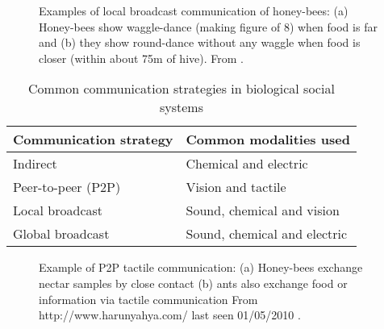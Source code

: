\begin{figure}
\centering
{} 
\hspace{0.25cm}
\caption{Examples of local broadcast communication of honey-bees: (a) Honey-bees show waggle-dance (making figure of 8) when food is far and (b) they show round-dance without any waggle when food is closer (within about 75m of hive). From \protect{}.}
\label{fig:honey-bee-dances}
\end{figure}
\begin{table}
\caption{Common communication strategies in biological social systems}
\label{table:bio-comm-strategy}
\begin{center}
\begin{tabular}{ll}
\hline 
\textbf{Communication strategy} & \textbf{Common modalities used}\\
\hline 
Indirect & Chemical and electric \\
Peer-to-peer (P2P) &  Vision and tactile\\
Local broadcast &  Sound, chemical and vision\\
Global broadcast & Sound, chemical and electric\\
\hline
\end{tabular}
\end{center}
\end{table}
\begin{figure}
\centering
{} 
\hspace{0.25cm}
\caption{Example of P2P tactile communication: (a) Honey-bees exchange nectar samples by close contact (b) ants also exchange food or information via tactile communication  From http://www.harunyahya.com/ last seen 01/05/2010 .}
\label{fig:bees-ants-p2p-comm}
\end{figure}
